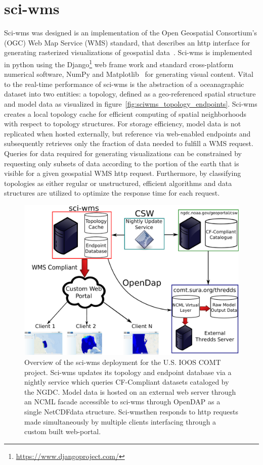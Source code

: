 \documentclass[11pt,twocolumn,twoside]{IEEEtran}
\newcommand{\comt}{COMT}
\newcommand{\ioos}{IOOS}
\newcommand{\ogc}{OGC}
\newcommand{\wms}{WMS}
\newcommand{\opendap}{OpenDAP}
\newcommand{\netcdf}{NetCDF}
\newcommand{\sciwms}{sci-wms}
\newcommand{\Sciwms}{Sci-wms}
\begin{document}
\section{\sciwms{}}
\Sciwms{} was designed is an implementation of the Open Geospatial
Consortium's (\ogc{}) Web Map Service (\wms{}) standard, that
describes an http interface for generating rasterized visualizations
of geospatial data~\cite{wms14}. Sci-wms is implemented in python
using the Django\footnote{\url{https://www.djangoproject.com/}} web
frame work and standard cross-platform numerical software, NumPy and
Matplotlib~\cite{numpy11, hunter07} for generating visual
content. Vital to the real-time performance of sci-wms is the
abstraction of a oceanagraphic dataset into two entities: a topology,
defined as a geo-referenced spatial structure and model data as
visualized in figure~\ref{fig:sciwms_topology_endpoints}. \Sciwms{}
creates a local topology cache for efficient computing of spatial
neighborhoods with respect to topology structures.  For storage
efficiency, model data is not replicated when hosted externally, but
reference via web-enabled endpoints and subsequently retrieves only
the fraction of data needed to fulfill a \wms{} request. Queries for
data required for generating visualizations can be constrained by
requesting only subsets of data according to the portion of the earth
that is visible for a given geospatial \wms{} http request.  Furthermore, by
classifying topologies as either regular or unstructured, efficient
algorithms and data structures are utilized to optimize the response
time for each request.

\begin{figure}
  \centering
  \includegraphics[width=\columnwidth]{./figs/overview.pdf}
  \caption{Overview of the \sciwms{} deployment for the U.S. \ioos{}
    \comt{} project. \Sciwms{} updates its topology and endpoint
    database via a nightly service which queries CF-Compliant datasets
    cataloged by the NGDC. Model data is hosted on an external web
    server through an NCML facade accessible to \sciwms{} through
    \opendap{} as a single \netcdf data structure. \Sciwms then
    responds to http requests made simultaneously by multiple clients
    interfacing through a custom built web-portal.}
  \label{fig:overview1}
\end{figure}
\end{document}
